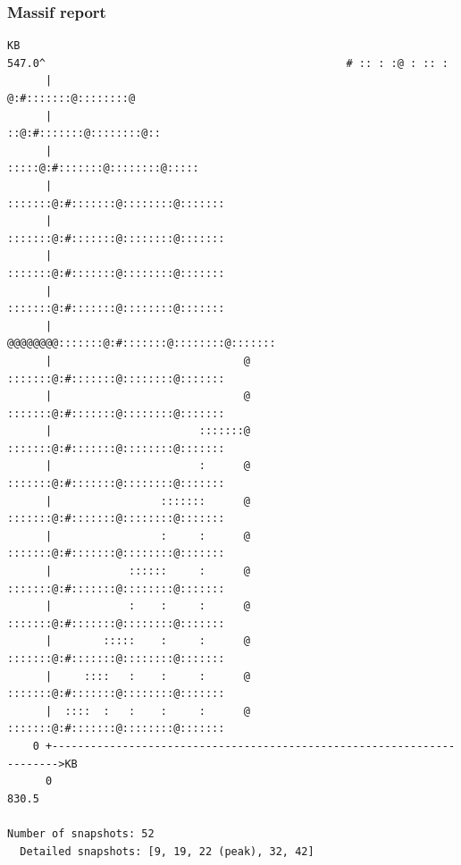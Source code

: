 \begin{frame}[fragile]
  \frametitle{Massif report}
  \begin{block}{}
    \begin{verbatim}
KB
547.0^                                               # :: : :@ : :: :         
      |                                             @:#:::::::@::::::::@       
      |                                           ::@:#:::::::@::::::::@::     
      |                                        :::::@:#:::::::@::::::::@:::::  
      |                                      :::::::@:#:::::::@::::::::@:::::::
      |                                      :::::::@:#:::::::@::::::::@:::::::
      |                                      :::::::@:#:::::::@::::::::@:::::::
      |                                      :::::::@:#:::::::@::::::::@:::::::
      |                              @@@@@@@@:::::::@:#:::::::@::::::::@:::::::
      |                              @       :::::::@:#:::::::@::::::::@:::::::
      |                              @       :::::::@:#:::::::@::::::::@:::::::
      |                       :::::::@       :::::::@:#:::::::@::::::::@:::::::
      |                       :      @       :::::::@:#:::::::@::::::::@:::::::
      |                 :::::::      @       :::::::@:#:::::::@::::::::@:::::::
      |                 :     :      @       :::::::@:#:::::::@::::::::@:::::::
      |            ::::::     :      @       :::::::@:#:::::::@::::::::@:::::::
      |            :    :     :      @       :::::::@:#:::::::@::::::::@:::::::
      |        :::::    :     :      @       :::::::@:#:::::::@::::::::@:::::::
      |     ::::   :    :     :      @       :::::::@:#:::::::@::::::::@:::::::
      |  ::::  :   :    :     :      @       :::::::@:#:::::::@::::::::@:::::::
    0 +----------------------------------------------------------------------->KB
      0                                                                   830.5

Number of snapshots: 52
  Detailed snapshots: [9, 19, 22 (peak), 32, 42]
    \end{verbatim}
  \end{block}
\end{frame}


